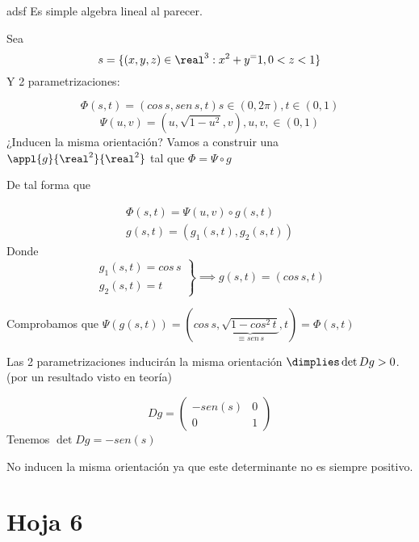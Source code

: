 \begin{problem}[10]

adsf
\solution
Es simple algebra lineal al parecer.
\end{problem}

\begin{problem}[11]
Sea \[s=\{(x,y,z)\in\real^3: x^2+y^=1, 0<z<1\}\]
Y 2 parametrizaciones:

\[\Phi(s,t)  = (cos\,s,sen\,s,t) s\in(0,2\pi),t\in(0,1)\]
\[\Psi(u,v)=(u,\sqrt{1-u^2},v),u,v,\in(0,1)\]
¿Inducen la misma orientación?
\solution
Vamos a construir una $\appl{g}{\real^2}{\real^2}$ tal que $\Phi = \Psi \circ g$

De tal forma que

\[\begin{array}{c}
\Phi(s,t) = \Psi(u,v)\circ g(s,t)\\
g(s,t) = (g_1(s,t),g_2(s,t))
\end{array}\]
Donde \[\left.\begin{array}{c}
g_1 (s,t) = cos\,s\\
g_2(s,t) = t
\end{array}\right\}\implies g(s,t)= (cos\,s,t)\]

Comprobamos que $\Psi(g(s,t)) = (cos\,s,\underbrace{\sqrt{1-cos^2\,t}}_{\equiv sen\,s},t) = \Phi(s,t)$

Las 2 parametrizaciones inducirán la misma orientación $\dimplies \det Dg > 0$. (por un resultado visto en teoría)

\[Dg = \begin{pmatrix}
-sen(s)&0\\0&1
\end{pmatrix}\]
Tenemos $\det Dg = -sen(s)$

No inducen la misma orientación ya que este determinante no es siempre positivo.

\end{problem}

\section{Hoja 6}

